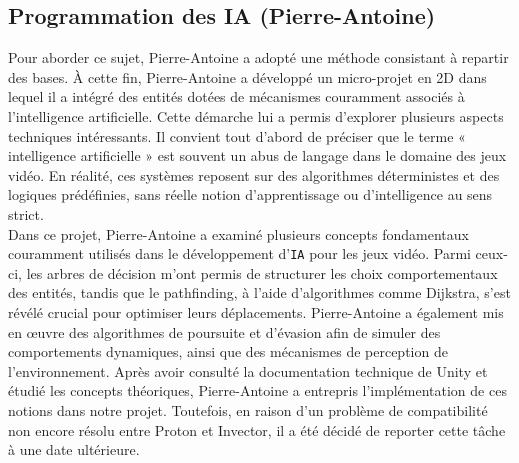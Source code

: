 \documentclass{report}
\begin{document}
\subsection*{Programmation des IA (Pierre-Antoine)}
Pour aborder ce sujet, Pierre-Antoine a adopté une méthode consistant à repartir des bases. À cette fin, Pierre-Antoine a développé un micro-projet en 2D dans lequel il a intégré des entités dotées de mécanismes couramment associés à l’intelligence artificielle. Cette démarche lui a permis d’explorer plusieurs aspects techniques intéressants. Il convient tout d’abord de préciser que le terme « intelligence artificielle » est souvent un abus de langage dans le domaine des jeux vidéo. En réalité, ces systèmes reposent sur des algorithmes déterministes et des logiques prédéfinies, sans réelle notion d’apprentissage ou d’intelligence au sens strict.
\\[0.4cm]
Dans ce projet, Pierre-Antoine a examiné plusieurs concepts fondamentaux couramment utilisés dans le développement d’\texttt{IA} pour les jeux vidéo. Parmi ceux-ci, les arbres de décision m’ont permis de structurer les choix comportementaux des entités, tandis que le pathfinding, à l’aide d’algorithmes comme Dijkstra, s’est révélé crucial pour optimiser leurs déplacements. Pierre-Antoine a également mis en œuvre des algorithmes de poursuite et d’évasion afin de simuler des comportements dynamiques, ainsi que des mécanismes de perception de l’environnement. Après avoir consulté la documentation technique de Unity et étudié les concepts théoriques, Pierre-Antoine a entrepris l’implémentation de ces notions dans notre projet. Toutefois, en raison d’un problème de compatibilité non encore résolu entre Proton et Invector, il a été décidé de reporter cette tâche à une date ultérieure.
\end{document}
